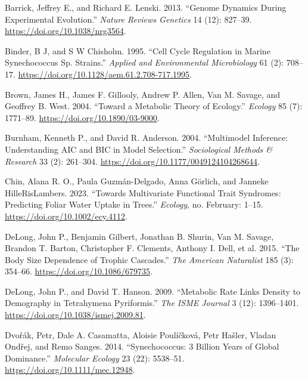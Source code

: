 \documentclass[
  letterpaper,
  DIV=11,
  numbers=noendperiod]{scrartcl}
\newlength{\cslhangindent}
\newenvironment{CSLReferences}[2] %
 {\begin{list}{}{%
  \setlength{\itemindent}{0pt}
  \setlength{\leftmargin}{0pt}
  \setlength{\parsep}{0pt}
  \ifodd #1
   \setlength{\leftmargin}{\cslhangindent}
   \setlength{\itemindent}{-1\cslhangindent}
  \fi
  \setlength{\itemsep}{#2\baselineskip}}}
 {\end{list}}
\begin{document}
\label{refs}
\begin{CSLReferences}{1}{0}
Barrick, Jeffrey E., and Richard E. Lenski. 2013. {``Genome Dynamics
During Experimental Evolution.''} \emph{Nature Reviews Genetics} 14
(12): 827--39. \url{https://doi.org/10.1038/nrg3564}.

Binder, B J, and S W Chisholm. 1995. {``Cell {Cycle Regulation} in
{Marine Synechococcus} Sp. {Strains}.''} \emph{Applied and Environmental
Microbiology} 61 (2): 708--17.
\url{https://doi.org/10.1128/aem.61.2.708-717.1995}.

Brown, James H., James F. Gillooly, Andrew P. Allen, Van M. Savage, and
Geoffrey B. West. 2004. {``Toward a {Metabolic Theory} of {Ecology}.''}
\emph{Ecology} 85 (7): 1771--89. \url{https://doi.org/10.1890/03-9000}.

Burnham, Kenneth P., and David R. Anderson. 2004. {``Multimodel
{Inference}: {Understanding AIC} and {BIC} in {Model Selection}.''}
\emph{Sociological Methods \& Research} 33 (2): 261--304.
\url{https://doi.org/10.1177/0049124104268644}.

Chin, Alana R. O., Paula Guzmán-Delgado, Anna Görlich, and Janneke
HilleRisLambers. 2023. {``Towards Multivariate Functional Trait
Syndromes: {Predicting} Foliar Water Uptake in Trees.''} \emph{Ecology},
no. February: 1--15. \url{https://doi.org/10.1002/ecy.4112}.

DeLong, John P., Benjamin Gilbert, Jonathan B. Shurin, Van M. Savage,
Brandon T. Barton, Christopher F. Clements, Anthony I. Dell, et al.
2015. {``The {Body Size Dependence} of {Trophic Cascades}.''} \emph{The
American Naturalist} 185 (3): 354--66.
\url{https://doi.org/10.1086/679735}.

DeLong, John P., and David T. Hanson. 2009. {``Metabolic Rate Links
Density to Demography in {Tetrahymena} Pyriformis.''} \emph{The ISME
Journal} 3 (12): 1396--1401.
\url{https://doi.org/10.1038/ismej.2009.81}.

Dvořák, Petr, Dale A. Casamatta, Aloisie Poulíčková, Petr Hašler, Vladan
Ondřej, and Remo Sanges. 2014. {``Synechococcus: 3 Billion Years of
Global Dominance.''} \emph{Molecular Ecology} 23 (22): 5538--51.
\url{https://doi.org/10.1111/mec.12948}.


\end{CSLReferences}
\end{document}
